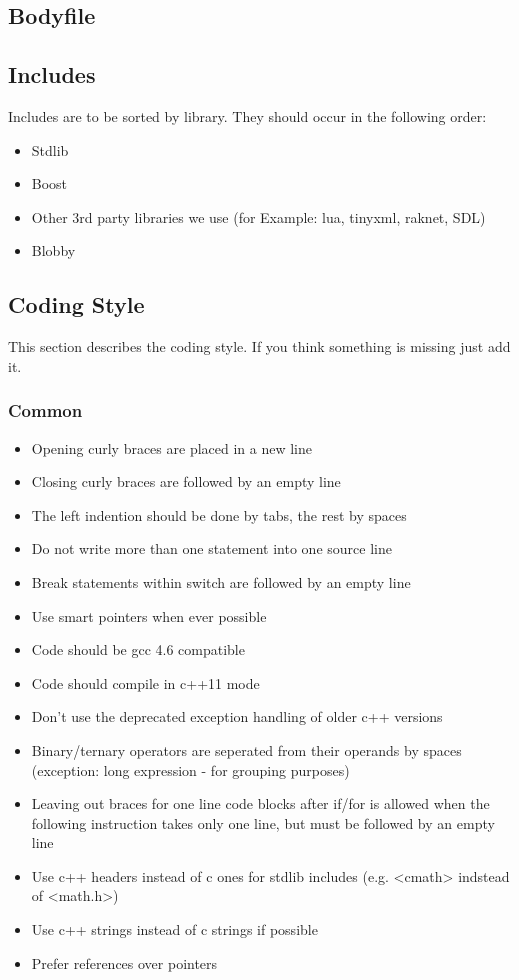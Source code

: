 \documentclass[a4paper]{scrartcl}
\begin{document}
\subsection{Bodyfile}


\subsection{Includes}
Includes are to be sorted by library. They should occur in the following order:
\begin{itemize}
	\item Stdlib
	\item Boost
	\item Other 3rd party libraries we use (for Example: lua, tinyxml, raknet, SDL)
	\item Blobby
\end{itemize}



\subsection{Coding Style}
This section describes the coding style. If you think something is missing just add it.


\subsubsection{Common}
\begin{itemize}
	\item Opening curly braces are placed in a new line
	\item Closing curly braces are followed by an empty line
	\item The left indention should be done by tabs, the rest by spaces
	\item Do not write more than one statement into one source line
	\item Break statements within switch are followed by an empty line
	\item Use smart pointers when ever possible
	\item Code should be gcc 4.6 compatible
	\item Code should compile in c++11 mode
	\item Don't use the deprecated exception handling of older c++ versions
	\item Binary/ternary operators are seperated from their operands by spaces (exception: long expression - for grouping purposes)
	\item Leaving out braces for one line code blocks after if/for is allowed when the following instruction takes only one line, but must be followed by an empty line 
	\item Use c++ headers instead of c ones for stdlib includes (e.g. <cmath> indstead of <math.h>)
	\item Use c++ strings instead of c strings if possible
	\item Prefer references over pointers
\end{itemize}
\end{document}

